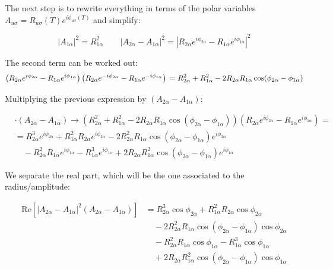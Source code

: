 \documentclass[11pt, a4paper]{article} %
\begin{document}
\begin{appendices}
The next step is to rewrite everything in terms of the polar variables $A_{u\sigma} = R_{u\sigma}(T) e^{i\phi_{u\sigma}(T)}$ and simplify: 

\begin{equation}
|A_{1\alpha}|^2 = R_{1\alpha}^2 \qquad |A_{2\alpha} - A_{1\alpha}|^2 = \left| R_{2\alpha} e^{i\phi_{2\alpha}} - R_{1\alpha} e^{i\phi_{1\alpha}} \right|^2
\end{equation}

The second term can be worked out:
\begin{equation}
 \left(R_{2\alpha} e^{i\phi_{2\alpha}} - R_{1\alpha} e^{i\phi_{1\alpha}}\right) 
 \left(R_{2\alpha} e^{-i\phi_{2\alpha}} - R_{1\alpha} e^{-i\phi_{1\alpha}}\right) \\
= R_{2\alpha}^2 + R_{1\alpha}^2 - 2R_{2\alpha} R_{1\alpha} \cos(\phi_{2\alpha} - \phi_{1\alpha})
\end{equation}

Multiplying the previous expression by $(A_{2\alpha} - A_{1\alpha})$:

\begin{equation}
\begin{aligned}
&\cdot (A_{2\alpha} - A_{1\alpha}) \rightarrow 
\left( R_{2\alpha}^2 + R_{1\alpha}^2 - 2R_{2\alpha} R_{1\alpha} \cos(\phi_{2\alpha} - \phi_{1\alpha}) \right) 
\left(R_{2\alpha} e^{i\phi_{2\alpha}} - R_{1\alpha} e^{i\phi_{1\alpha}}\right) = \\
&= R_{2\alpha}^3 e^{i\phi_{2\alpha}} + R_{1\alpha}^2 R_{2\alpha} e^{i\phi_{2\alpha}} 
- 2R_{2\alpha}^2 R_{1\alpha} \cos(\phi_{2\alpha} - \phi_{1\alpha}) e^{i\phi_{2\alpha}} \\
&\quad - R_{2\alpha}^2 R_{1\alpha} e^{i\phi_{1\alpha}} - R_{1\alpha}^3 e^{i\phi_{1\alpha}} 
+ 2R_{2\alpha} R_{1\alpha}^2 \cos(\phi_{2\alpha} - \phi_{1\alpha}) e^{i\phi_{1\alpha}}
\label{eq_MSE_2nodes_cubic}
\end{aligned}
\end{equation}

We separate the real part, which will be the one associated to the radius/amplitude: 

\begin{equation}
\begin{aligned}
\text{Re}\left[ |A_{2\alpha} - A_{1\alpha}|^2 (A_{2\alpha} - A_{1\alpha}) \right] &= 
R_{2\alpha}^3 \cos\phi_{2\alpha} + R_{1\alpha}^2 R_{2\alpha} \cos\phi_{2\alpha} \\
&\quad - 2R_{2\alpha}^2 R_{1\alpha} \cos(\phi_{2\alpha} - \phi_{1\alpha}) \cos\phi_{2\alpha} \\
&\quad - R_{2\alpha}^2 R_{1\alpha} \cos\phi_{1\alpha} - R_{1\alpha}^3 \cos\phi_{1\alpha} \\
&\quad + 2R_{2\alpha} R_{1\alpha}^2 \cos(\phi_{2\alpha} - \phi_{1\alpha}) \cos\phi_{1\alpha}
\end{aligned}
\end{equation}


\end{appendices}
\end{document}
